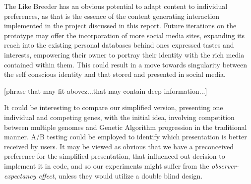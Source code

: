 \documentclass[]{article}
\begin{document}
The Like Breeder has an obvious potential to adapt content to individual preferences, as that is the essence of the content generating interaction implemented in the project discussed in this report.  Future iterations on the prototype may offer the incorporation of more social media sites, expanding its reach into the existing personal databases behind ones expressed tastes and interests, empowering their owner to portray their identity with the rich media contained within them.  This could result in a move towards singularity between the self conscious identity and that stored and presented in social media.

[phrase that may fit above^^:...that may contain deep information...]



It could be interesting to compare our simplified version, presenting one individual and competing genes, with the initial idea, involving competition between multiple genomes and Genetic Algorithm progression in the traditional manner.  A/B testing could be employed to identify which presentation is better received by users.  It may be viewed as obvious that we have a preconceived preference for the simplified presentation, that influenced out decision to implement it in code, and so our experiments might suffer from the \textit{observer-expectancy effect}, unless they would utilize a double blind design.
\end{document}
